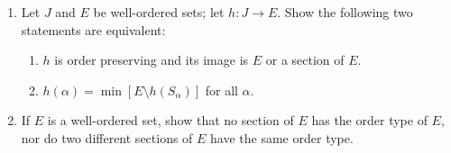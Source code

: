 \documentclass[a4paper,12pt]{article}
\begin{document}
\begin{exe}\leavevmode \par
	\begin{enumerate}
		\item
		      Let \( J \) and \( E \) be well-ordered sets;
		      let \( h: J \to E \).
		      Show the following two statements are equivalent:
		      \begin{enumerate}
			      \item
			            \( h \) is order preserving and its image is \( E \) or a section of \( E \).
			            
			      \item
			            \( h(\alpha) = \min{\left[ E \setminus h(S_{\alpha}) \right]} \)
			            for all \( \alpha \).
		      \end{enumerate}
		\item
		      If \( E \) is a well-ordered set,
		      show that no section of \( E \) has the order type of \( E \),
		      nor do two different sections of \( E \) have the same order type.
	\end{enumerate}
\end{exe}
\end{document}
